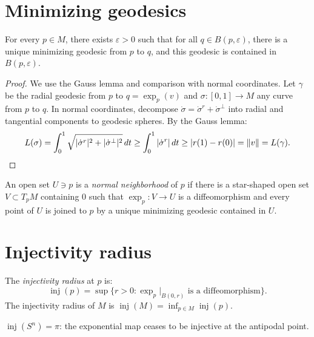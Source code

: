 \section{Minimizing geodesics}

\begin{theorem}
\label{thm:geod_min}
For every $p \in M$, there exists $\varepsilon > 0$ such that for all
$q \in B(p, \varepsilon)$, there is a unique minimizing geodesic from $p$ to $q$,
and this geodesic is contained in $B(p, \varepsilon)$.
\end{theorem}

\begin{proof}
We use the Gauss lemma and comparison with normal coordinates. Let $\gamma$ be
the radial geodesic from $p$ to $q = \exp_p(v)$ and $\sigma : [0,1] \to M$ any
curve from $p$ to $q$. In normal coordinates, decompose
$\dot\sigma = \dot\sigma^r + \dot\sigma^\perp$ into radial and tangential components
to geodesic spheres. By the Gauss lemma:
\[
    L(\sigma) = \int_0^1 \sqrt{|\dot\sigma^r|^2 + |\dot\sigma^\perp|^2}\, dt
    \geq \int_0^1 |\dot\sigma^r|\, dt \geq |r(1) - r(0)| = \left\| v \right\| = L(\gamma).
\]
\end{proof}

\begin{definition}
An open set $U \ni p$ is a \emph{normal neighborhood} of $p$ if there is a
star-shaped open set $V \subset T_pM$ containing $0$ such that $\exp_p : V \to U$
is a diffeomorphism and every point of $U$ is joined to $p$ by a unique
minimizing geodesic contained in $U$.
\end{definition}

\section{Injectivity radius}

\begin{definition}
The \emph{injectivity radius} at $p$ is:
\[
    \operatorname{inj}(p) = \sup\{r > 0 : \exp_p|_{B(0,r)} \text{ is a diffeomorphism}\}.
\]
The injectivity radius of $M$ is $\operatorname{inj}(M) = \inf_{p \in M} \operatorname{inj}(p)$.
\end{definition}

\begin{example}
$\operatorname{inj}(S^n) = \pi$: the exponential map ceases to be injective at the
antipodal point.
\end{example}

